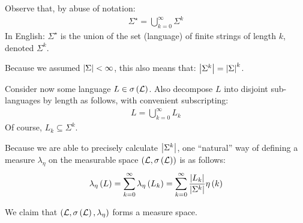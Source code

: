 Observe that, by abuse of notation:
\begin{align*}
  \Sigma^\star =
    \bigcup_{k = 0}^{\infty} \Sigma^k
\end{align*}
In English: \(\Sigma^\star\) is the union of the set (language) of finite
strings of length \(k\), denoted \(\Sigma^k\).

Because we assumed \(\left\lvert\Sigma\right\rvert < \infty\), this also means that:
\(\left\lvert\Sigma^k\right\rvert = \left\lvert\Sigma\right\rvert^k\).

Consider now some language \(L \in \sigma\left(\mathcal{L}\right)\).
Also decompose \(L\) into disjoint sub-languages by length as follows,
with convenient subscripting:
\begin{align*}
  L = \bigcup_{k = 0}^{\infty} L_k
\end{align*}
Of course, \(L_k \subseteq \Sigma^k\).

Because we are able to precisely calculate \(\left\lvert\Sigma^k\right\rvert\),
one ``natural'' way of defining a measure \(\lambda_{\eta}\) on
the measurable space \(\left(\mathcal{L}, \sigma\left(\mathcal{L}\right)\right)\)
is as follows:
\begin{align*}
  \lambda_{\eta} \left(L\right)
    = \sum_{k = 0}^{\infty} \lambda_{\eta} \left(L_k\right)
    = \sum_{k = 0}^{\infty} \frac{\left\lvert L_k\right\rvert}{\left\lvert\Sigma^k\right\rvert} \eta\left(k\right)
\end{align*}

We claim that
\(\left(\mathcal{L}, \sigma\left(\mathcal{L}\right), \lambda_{\eta}\right)\)
forms a measure space.

